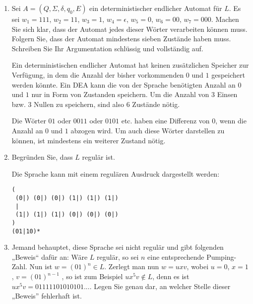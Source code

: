 \documentclass{lehramt-informatik-aufgabe}
\begin{document}
\begin{enumerate}


\item Sei $A = (Q, \Sigma, \delta, q_0 , E)$ ein deterministischer
endlicher Automat für $L$. Es sei $w_1 = 111$, $w_2 = 11$, $w_3 = 1$, $
w_4 = \epsilon$, $w_5 = 0$, $w_6 = 00$, $w_7 = 000$. Machen Sie sich
klar, dass der Automat jedes dieser Wörter verarbeiten können muss.
Folgern Sie, dass der Automat mindestens sieben Zustände haben muss.
Schreiben Sie Ihr Argumentation schlüssig und vollständig auf.

\begin{liAntwort}
Ein deterministischen endlicher Automat hat keinen zusätzlichen Speicher
zur Verfügung, in dem die Anzahl der bisher vorkommenden $0$ und $1$
gespeichert werden könnte. Ein DEA kann die von der Sprache benötigten
Anzahl an $0$ und $1$ nur in Form von Zustanden speichern. Um die Anzahl
von 3 Einsen bzw. 3 Nullen zu speichern, sind also 6 Zustände nötig.

Die Wörter $01$ oder $0011$ oder $0101$ etc. haben eine Differenz von
$0$, wenn die Anzahl an $0$ und $1$ abzogen wird. Um auch diese Wörter
darstellen zu können, ist mindestens ein weiterer Zustand nötig.
\end{liAntwort}


\item Begründen Sie, dass $L$ regulär ist.

\begin{liAntwort}
Die Sprache kann mit einem regulären Ausdruck dargestellt werden:

\begin{verbatim}
(
 (0|) (0|) (0|) (1|) (1|) (1|)
 |
 (1|) (1|) (1|) (0|) (0|) (0|)
)
(01|10)*
\end{verbatim}
\end{liAntwort}


\item Jemand behauptet, diese Sprache sei nicht regulär und gibt
folgenden „Beweis“ dafür an: Wäre $L$ regulär, so sei $n$ eine
entsprechende Pumping-Zahl. Nun ist $w = (01)^n \in L$. Zerlegt man nun
$w = uxv$, wobei $u = 0$, $x = 1$, $v = (01)^{n-1}$ , so ist zum Beispiel
$ux^5 v \notin L$, denn es ist $ux^5 v = 01111101010101$.... Legen Sie
genau dar, an welcher Stelle dieser „Beweis” fehlerhaft ist.


\end{enumerate}
\end{document}
